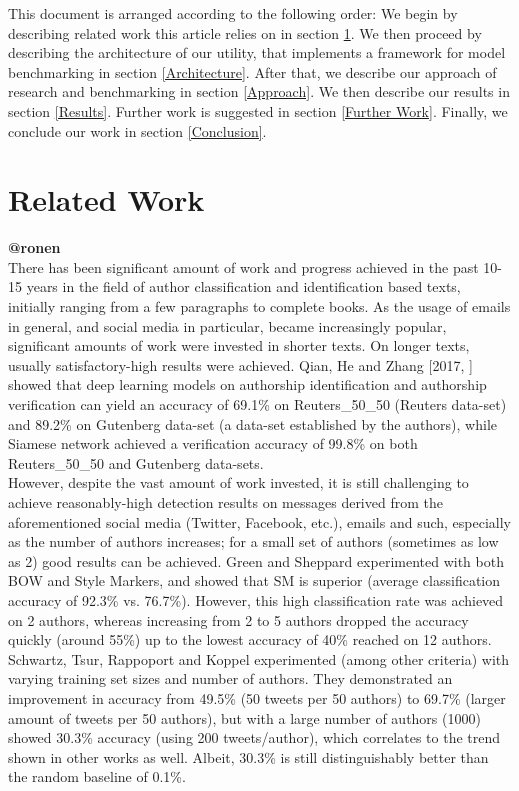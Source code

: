 \documentclass[a4paper]{article}
\begin{document}
This document is arranged according to the following order:
We begin by describing related work this article relies on in section \ref{Related Work}.
We then proceed by describing the architecture of our utility, that implements a framework for model benchmarking in section \ref{Architecture}.
After that, we describe our approach of research and benchmarking in section \ref{Approach}.
We then describe our results in section \ref{Results}.
Further work is suggested in section \ref{Further Work}.
Finally, we conclude our work in section \ref{Conclusion}.
\section{Related Work}
\label{Related Work}
\textbf{@ronen}\\
There has been significant amount of work and progress achieved in the past 10-15 years in the field of author classification and identification based texts, initially ranging from a few paragraphs to complete books. As the usage of emails in general, and social media in particular, became increasingly popular, significant amounts of work were invested in shorter texts.
On longer texts, usually satisfactory-high results were achieved. Qian, He and Zhang [2017, \cite{qian}] showed that deep learning models on authorship identification and authorship verification can yield an accuracy of 69.1\% on Reuters\_50\_50 (Reuters data-set) and 89.2\% on Gutenberg data-set (a data-set established by the authors), while Siamese network achieved a verification accuracy of 99.8\% on both Reuters\_50\_50 and Gutenberg data-sets.\\
However, despite the vast amount of work invested, it is still challenging to achieve reasonably-high detection results on messages derived from the aforementioned social media (Twitter, Facebook, etc.), emails and such, especially as the number of authors increases; for a small set of authors (sometimes as low as 2) good results can be achieved. Green and Sheppard \cite{rachel} experimented with both BOW and Style Markers, and showed that SM is superior (average classification accuracy of 92.3\% vs. 76.7\%). However, this high classification rate was achieved on 2 authors, whereas increasing from 2 to 5 authors dropped the accuracy quickly (around 55\%) up to the lowest accuracy of 40\% reached on 12 authors.
Schwartz, Tsur, Rappoport and Koppel \cite{schwartz} experimented (among other criteria) with varying training set sizes and number of authors. They demonstrated an improvement in accuracy from 49.5\% (50 tweets per 50 authors) to 69.7\% (larger amount of tweets per 50 authors), but with a large number of authors (1000) showed 30.3\% accuracy (using 200 tweets/author), which correlates to the trend shown in other works as well. Albeit, 30.3\% is still  distinguishably better than the random baseline of 0.1\%.
\end{document}
